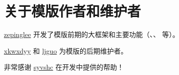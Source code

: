 
\section{关于模版作者和维护者}

\href{https://github.com/zepinglee}{zepinglee} 开发了模版前期的大框架和主要功能（、、 等）。

\href{https://github.com/xkwxdyy}{xkwxdyy} 和 \href{https://github.com/ljguo1020}{ljguo} 为模版的后期维护者。

非常感谢 \href{https://github.com/syvshc}{syvshc} 在开发中提供的帮助！